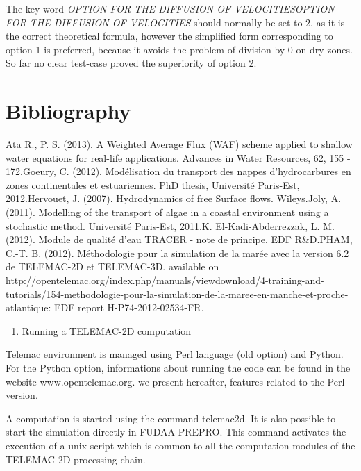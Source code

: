 \documentclass{article} %
\begin{document}
 The key-word \textit{OPTION FOR THE DIFFUSION OF VELOCITIESOPTION FOR THE DIFFUSION OF VELOCITIES} should normally be set to 2, as it is the correct theoretical formula, however the simplified form corresponding to option 1 is preferred, because it avoids the problem of division by 0 on dry zones. So far no clear test-case proved the superiority of option 2.




\section{Bibliography}

 Ata R., P. S. (2013). A Weighted Average Flux (WAF) scheme applied to shallow water equations for real-life applications. Advances in Water Resources, 62, 155 - 172.Goeury, C. (2012). Mod\'{e}lisation du transport des nappes d'hydrocarbures en zones continentales et estuariennes. PhD thesis, Universit\'{e} Paris-Est, 2012.Hervouet, J. (2007). Hydrodynamics of free Surface flows. Wileys.Joly, A. (2011). Modelling of the transport of algae in a coastal environment using a stochastic method. Universit\'{e} Paris-Est, 2011.K. El-Kadi-Abderrezzak, L. M. (2012). Module de qualit\'{e} d'eau TRACER - note de principe. EDF R\&D.PHAM, C.-T. B. (2012). M\'{e}thodologie pour la simulation de la mar\'{e}e avec la version 6.2 de TELEMAC-2D et TELEMAC-3D. available on http://opentelemac.org/index.php/manuals/viewdownload/4-training-and-tutorials/154-methodologie-pour-la-simulation-de-la-maree-en-manche-et-proche-atlantique: EDF report H-P74-2012-02534-FR.





\begin{enumerate}
\item   Running a TELEMAC-2D computation
\end{enumerate}



 Telemac environment is managed using Perl language (old option) and Python. For the Python option, informations about running the code can be found in the website www.opentelemac.org. we present hereafter, features related to the Perl version.

 A computation is started using the command telemac2d. It is also possible to start the simulation directly in FUDAA-PREPRO. This command activates the execution of a unix script which is common to all the computation modules of the TELEMAC-2D processing chain.
\end{document}
